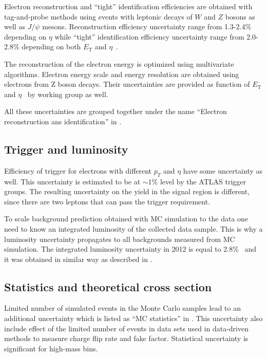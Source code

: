 Electron reconstruction and ``tight'' identification efficiencies are obtained with tag-and-probe methods using
events with leptonic decays of $W$ and $Z$ bosons as well as $J/\psi$ mesons.
Reconstruction efficiency uncertainty range from 1.3-2.4\% depending on $\eta$ while
``tight'' identification efficiency uncertainty range from 2.0-2.8\% depending on both $E_\mathrm{T}$ and $\eta$~\cite{electron_reco_id_2011}.

The reconstruction of the electron energy is optimized using multivariate algorithms.
Electron energy scale and energy resolution are obtained using electrons from Z boson decays.
Their uncertainties are provided as function of $E_\mathrm{T}$ and $\eta$~\cite{electron_energy_errors_Run1} 
by working group as well.

All these uncertainties are grouped together under the name ``Electron reconstruction ans identification'' in .

\subsection{Trigger and luminosity}
Efficiency of trigger for electrons with different $p_T$ and $\eta$ have some uncertainty as well.
This uncertainty is estimated to be at $\sim1\%$ level by the ATLAS trigger groups.
The resulting uncertainty on the yield in the signal region is different, since there are two leptons that can pass the trigger requirement. 

To scale background prediction obtained with MC simulation to the data 
one need to know an integrated luminosity of the collected data sample. 
This is why a luminosity uncertainty propagates to all backgrounds measured from MC simulation.
The integrated luminosity uncertainty in 2012 is equal to 2.8$\%$~\cite{Aad:2013ucp} 
and it was obtained in similar way as described in .

\subsection{Statistics and theoretical cross section}
Limited number of simulated events in the Monte Carlo samples lead to an additional uncertainty which is listed as ``MC statistics'' in .
This uncertainty also include effect of the limited number of events in data sets used in data-driven methods to measure charge flip rate and fake factor.
Statistical uncertainty is significant for high-mass bins.

